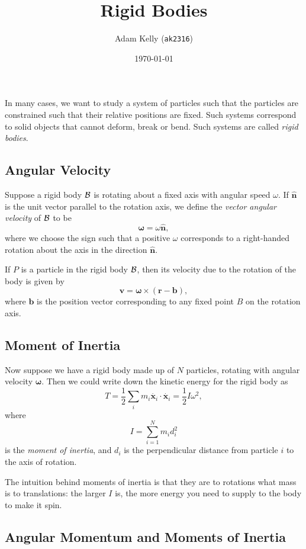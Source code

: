\documentclass{scrartcl}
\title{Rigid Bodies}
\author{Adam Kelly (\texttt{ak2316})}
\date{\today}
\newcommand{\vv}[1]{\boldsymbol{\mathbf{#1}}}
\theoremstyle{definition}
\newcommand{\vocab}[1]{\emph{#1}}
\newcommand{\hh}[1]{\hat{\vv{#1}}}
\begin{document}
\maketitle  


In many cases, we want to study a system of particles such that the particles are constrained such that their relative positions are fixed. Such systems correspond to solid objects that cannot deform, break or bend. 
Such systems are called \emph{rigid bodies}.

\subsection*{Angular Velocity}

Suppose a rigid body $\mathcal{B}$ is rotating about a fixed axis with angular speed $\omega$. If $\hh n$ is the unit vector parallel to the rotation axis, we define the \emph{vector angular velocity} of $\mathcal{B}$ to be
$$
\vv \omega = \omega \hh n,
$$
where we choose the sign such that a positive $\omega$ corresponds to a right-handed rotation about the axis in the direction $\hh n$.

If $P$ is a particle in the rigid body $\mathcal{B}$, then its velocity due to the rotation of the body is given by
$$
\vv v = \vv \omega \times (\vv r - \vv b),
$$
where $\vv b$ is the position vector corresponding to any fixed point $B$ on the rotation axis.

\subsection*{Moment of Inertia}

Now suppose we have a rigid body made up of $N$ particles, rotating with angular velocity $\vv \omega$. Then we could write down the kinetic energy for the rigid body as
$$
T = \frac{1}{2} \sum_{i} m_i  \dot{\vv x_i} \cdot \dot{\vv x_i} = \frac{1}{2}I \omega^2,
$$
where
$$
I = \sum_{i = 1}^N m_i d_i^2
$$
is the \vocab{moment of inertia}, and $d_i$ is the perpendicular distance from particle $i$ to the axis of rotation.

The intuition behind moments of inertia is that they are to rotations what mass is to translations: the larger $I$ is, the more energy you need to supply to the body to make it spin.

\subsection*{Angular Momentum and Moments of Inertia}
\end{document}
